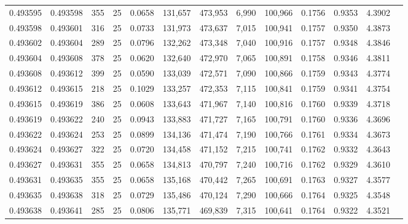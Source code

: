 \begin{tabular}{rrrrrrrrrrrrr}
0.493595 & 0.493598 &   355 &  25 &                                     0.0658 & 131,657 & 473,953 &   6,990 & 100,966 & 0.1756 & 0.9353 & 4.3902 \\
0.493598 & 0.493601 &   316 &  25 &                                     0.0733 & 131,973 & 473,637 &   7,015 & 100,941 & 0.1757 & 0.9350 & 4.3873 \\
0.493602 & 0.493604 &   289 &  25 &                                     0.0796 & 132,262 & 473,348 &   7,040 & 100,916 & 0.1757 & 0.9348 & 4.3846 \\
0.493604 & 0.493608 &   378 &  25 &                                     0.0620 & 132,640 & 472,970 &   7,065 & 100,891 & 0.1758 & 0.9346 & 4.3811 \\
0.493608 & 0.493612 &   399 &  25 &                                     0.0590 & 133,039 & 472,571 &   7,090 & 100,866 & 0.1759 & 0.9343 & 4.3774 \\
0.493612 & 0.493615 &   218 &  25 &                                     0.1029 & 133,257 & 472,353 &   7,115 & 100,841 & 0.1759 & 0.9341 & 4.3754 \\
0.493615 & 0.493619 &   386 &  25 &                                     0.0608 & 133,643 & 471,967 &   7,140 & 100,816 & 0.1760 & 0.9339 & 4.3718 \\
0.493619 & 0.493622 &   240 &  25 &                                     0.0943 & 133,883 & 471,727 &   7,165 & 100,791 & 0.1760 & 0.9336 & 4.3696 \\
0.493622 & 0.493624 &   253 &  25 &                                     0.0899 & 134,136 & 471,474 &   7,190 & 100,766 & 0.1761 & 0.9334 & 4.3673 \\
0.493624 & 0.493627 &   322 &  25 &                                     0.0720 & 134,458 & 471,152 &   7,215 & 100,741 & 0.1762 & 0.9332 & 4.3643 \\
0.493627 & 0.493631 &   355 &  25 &                                     0.0658 & 134,813 & 470,797 &   7,240 & 100,716 & 0.1762 & 0.9329 & 4.3610 \\
0.493631 & 0.493635 &   355 &  25 &                                     0.0658 & 135,168 & 470,442 &   7,265 & 100,691 & 0.1763 & 0.9327 & 4.3577 \\
0.493635 & 0.493638 &   318 &  25 &                                     0.0729 & 135,486 & 470,124 &   7,290 & 100,666 & 0.1764 & 0.9325 & 4.3548 \\
0.493638 & 0.493641 &   285 &  25 &                                     0.0806 & 135,771 & 469,839 &   7,315 & 100,641 & 0.1764 & 0.9322 & 4.3521 \\

\end{tabular}

